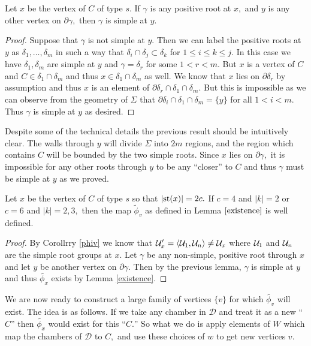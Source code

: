 \documentclass[class=book, crop=false,12 pt]{standalone}
\begin{document}
\begin{lemma}
\label{positiveeverywhereelse}
	Let $x$ be the vertex of $C$ of type $s.$ If $\gamma$ is any positive root at $x,$ and $y$ is any other vertex on $\partial\gamma,$ then $\gamma$ is simple at $y.$
\end{lemma}
\begin{proof} 
	Suppose that $\gamma$ is not simple at $y.$ Then we can label the positive roots at $y$ as $\delta_1,\dots,\delta_m$ in such a way that $\delta_i\cap \delta_j\subset \delta_k$ for $1\le i\le k\le j.$ In this case we have $\delta_1,\delta_m$ are simple at $y$ and $\gamma=\delta_r$ for some $1<r<m.$ But $x$ is a vertex of $C$ and $C\in \delta_1\cap \delta_m$ and thus $x\in \delta_1\cap \delta_m$ as well. We know that $x$ lies on $\partial \delta_r$ by assumption and thus $x$ is an element of $\partial \delta_r \cap \delta_1\cap \delta_m.$ But this is impossible as we can observe from the geometry of $\Sigma$ that $\partial \delta_i\cap \delta_1\cap \delta_m=\{y\}$ for all $1<i<m.$ Thus $\gamma$ is simple at $y$ as desired.
\end{proof}
Despite some of the technical details the previous result should be intuitively clear. The walls through $y$ will divide $\Sigma$ into $2m$ regions, and the region which contains $C$ will be bounded by the two simple roots. Since $x$ lies on $\partial \gamma,$ it is impossible for any other roots through $y$ to be any ``closer'' to $C$ and thus $\gamma$ must be simple at $y$ as we proved.
\begin{cor}
	Let $x$ be the vertex of $C$ of type $s$ so that $|\mathrm{st}(x)|=2c.$ If $c=4$ and $|k|=2$ or $c=6$ and $|k|=2,3,$ then the map $\tilde{\phi}_v$ as defined in Lemma $\ref{existence}$ is well defined.
\end{cor}
\begin{proof}
	By Corollrry \ref{phiv} we know that $\mathcal{U}'_x=\langle\mathcal{U}_1,\mathcal{U}_n\rangle\neq \mathcal{U}_x$ where $\mathcal{U}_1$ and $\mathcal{U}_n$ are the simple root groups at $x.$
	Let $\gamma$ be any non-simple, positive root through $x$ and let $y$ be another vertex on $\partial \gamma.$ Then by the previous lemma, $\gamma$ is simple at $y$ and thus $\tilde{\phi_x}$ exists by Lemma \ref{existence}.
\end{proof}

We are now ready to construct a large family of vertices $\{v\}$ for which $\tilde{\phi_v}$ will exist. The idea is as follows. If we take any chamber in $\mathcal{D}$ and treat it as a new ``$C$'' then $\tilde{\phi_x}$ would exist for this ``$C.$'' So what we do is apply elements of $W$ which map the chambers of $\mathcal{D}$ to $C,$ and use these choices of $w$ to get new vertices $v.$
\end{document}
